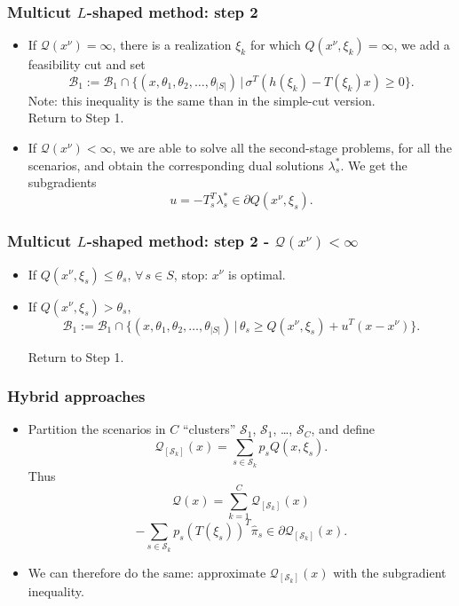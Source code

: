 \documentclass{beamer}
\begin{document}
\begin{frame}
\frametitle{Multicut $L$-shaped method: step 2}
	
\begin{itemize}
\item
If $\mathcal{Q}(x^{\nu}) = \infty$, there is a realization $\xi_k$ for which $Q(x^{\nu}, \xi_k) = \infty$, we add a feasibility cut and set
\[
\mathcal{B}_1 := \mathcal{B}_1 \cap \lbrace
(x,\theta_1,\theta_2,\ldots,\theta_{|S|}) \,|\, \sigma^T(h(\xi_k) -
T(\xi_k)x) \geq 0\rbrace.
\]
Note: this inequality is the same than in the simple-cut version.\\
Return to Step 1.
\item
If $\mathcal{Q}(x^{\nu}) < \infty$, we are able to solve all the second-stage problems, for all the scenarios, and obtain the corresponding dual solutions $\lambda_s^*$.
We get the subgradients
\[
u = -T_s^T\lambda_s^* \in \partial Q(x^{\nu}, \xi_s).
\]
\end{itemize}
	
\end{frame}

\begin{frame}
\frametitle{Multicut $L$-shaped method: step 2 - $\mathcal{Q}(x^{\nu}) < \infty$}
	
\begin{itemize}
\item
If $Q(x^{\nu}, \xi_s) \leq \theta_s$, $\forall\, s \in S$, stop: $x^{\nu}$ is optimal.
\item
If $Q(x^{\nu}, \xi_s) > \theta_s$,
\[
\mathcal{B}_1 := \mathcal{B}_1 \cap \lbrace (x,\theta_1,\theta_2,\ldots,\theta_{|S|}) \,|\,
\theta_s \geq Q(x^{\nu}, \xi_s) + u^T(x-x^{\nu})\rbrace.
\]
		
Return to Step 1.
\end{itemize}
	
\end{frame}

\begin{frame}
\frametitle{Hybrid approaches}

\begin{itemize}
	\item
	Partition the scenarios in $C$ ``clusters'' $\mathcal{S}_1$,
	$\mathcal{S}_1$, \ldots, $\mathcal{S}_C$, and define
	\[
	\mathcal{Q}_{[\mathcal{S}_k]}(x) = \sum_{s \in \mathcal{S}_k} p_s Q(x, \xi_s).
	\]
	Thus
	\[
	\mathcal{Q}(x) = \sum_{k = 1}^C \mathcal{Q}_{[\mathcal{S}_k]}(x)
	\]
	\[
	-\sum_{s \in \mathcal{S}_k} p_s(T(\xi_s))^T\hat{\pi}_s
	\in \partial \mathcal{Q}_{[\mathcal{S}_k]}(x).
	\]
	\item
	We can therefore do the same: approximate $\mathcal{Q}_{[\mathcal{S}_k]}(x)$ with the subgradient inequality.
\end{itemize}

\end{frame}
\end{document}
